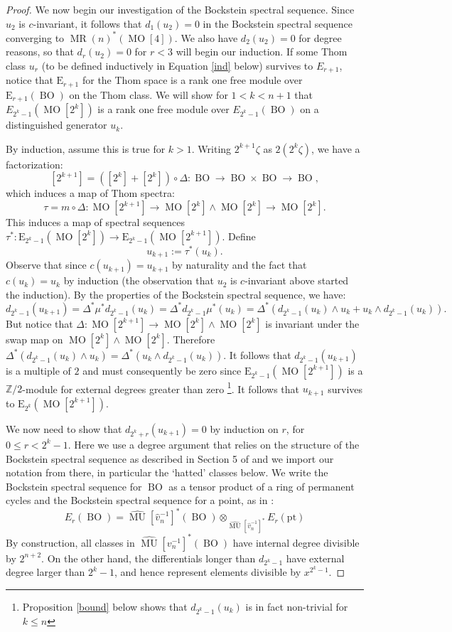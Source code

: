 \documentclass[12pt]{amsart}
\numberwithin{equation}{section}
\theoremstyle{plain}  %
\theoremstyle{definition}  %
\newcommand{\Z}{\mathbb{Z}}
\DeclareMathOperator{\BOg}{BO}
\DeclareMathOperator{\MO}{MO}
\DeclareMathOperator{\MUR}{MR}
\DeclareMathOperator{\MUg}{MU}
\begin{document}
\begin{proof}
We now begin our investigation of the Bockstein spectral sequence. Since $u_2$ is $c$-invariant, it follows that $d_1(u_2)=0$ in the Bockstein spectral sequence converging to $\MUR(n)^*(\MO[4])$. We also have $d_2(u_2)=0$ for degree reasons, so that $d_r(u_2)=0$ for $r<3$ will begin our induction. If some Thom class $u_r$ (to be defined inductively in Equation \ref{ind} below) survives to $E_{r+1}$, notice that $\mbox{E}_{r+1}$ for the Thom space is a rank one free module over $\mbox{E}_{r+1}(\BOg)$ on the Thom class. We will show for $1<k<n+1$ that $E_{2^k-1}(\MO[2^k])$ is a rank one free module over $E_{2^k-1}(\BOg)$ on a distinguished generator $u_k$. 

By induction, assume this is true for $k>1$. Writing $2^{k+1}\zeta$ as $2(2^k\zeta)$, we have a factorization:
\[ [2^{k+1}] = ([2^k] + [2^k]) \circ \Delta : 
\BOg \longrightarrow \BOg \times \BOg \longrightarrow \BOg, \]
which induces a map of Thom spectra:
\[ \tau = m \circ \Delta : \MO[2^{k+1}] \longrightarrow \MO[2^k] 
\wedge \MO[2^k] \longrightarrow \MO[2^k]. \]
This induces a map of spectral sequences $\tau^\ast : 
\mbox{E}_{2^{k}-1}(\MO[2^k]) \longrightarrow 
\mbox{E}_{2^k-1}(\MO[2^{k+1}])$. 
Define 
\begin{equation}\label{ind}u_{k+1}:=\tau^\ast(u_k).\end{equation}
Observe that since $c(u_{k+1})=u_{k+1}$ by naturality and the fact that $c(u_k)=u_k$ by induction (the observation that $u_2$ is $c$-invariant above started the induction). By the properties of the Bockstein spectral sequence, we have: 
\[ d_{2^k-1}(u_{k+1}) = \Delta^\ast \mu^\ast 
d_{2^{k}-1}(u_k) = \Delta^\ast d_{2^{k}-1} \mu^\ast (u_k) = 
\Delta^\ast (d_{2^{k}-1}(u_k) \wedge u_k + u_k 
\wedge d_{2^{k}-1}(u_k)). \]
But notice that $\Delta : \MO[2^{k+1}] 
\longrightarrow \MO[2^k] \wedge \MO[2^k]$ is invariant 
under the swap map on $\MO[2^k] \wedge \MO[2^k]$. 
Therefore $\Delta^\ast (d_{2^{k}-1}(u_k) \wedge u_k) = 
\Delta^\ast (u_k \wedge d_{2^{k}-1}(u_k))$. 
It follows that $d_{2^{k}-1}(u_{k+1})$ is a 
multiple of $2$ and must consequently be zero 
since $\mbox{E}_{2^{k}-1}(\MO[2^{k+1}])$ is a $\Z/2$-module 
for external degrees greater than zero \footnote{Proposition \ref{bound} below shows that $d_{2^k-1}(u_k)$ is in fact non-trivial for $k \leq n$}. It follows that $u_{k+1}$ survives 
to $\mbox{E}_{2^{k}}(\MO[2^{k+1}])$. 

\medskip
\noindent
We now need to show that $d_{2^{k}+r}(u_{k+1})=0$ by induction
on $r$, for $0 \le r < 2^{k}-1$. Here we use a degree argument that relies on the structure of the Bockstein spectral sequence as described in Section 5 of \cite{KW14} and we import our notation from there, in particular the `hatted' classes below. We write the Bockstein spectral sequence for $\BOg$ as a tensor product of a ring of permanent cycles and the Bockstein spectral sequence for a point, as in \cite{KW14}:
$$E_r(\BOg)=\hat{\MUg}[\hat{v}_n^{-1}]^*(\BOg) \otimes_{\hat{\MUg}[\hat{v}_n^{-1}]^*} E_r(\text{pt})$$
By construction, all classes in $\hat{\MUg}[v_n^{-1}]^\ast(\BOg)$ have internal 
degree divisible by $2^{n+2}$. On the other hand, the differentials 
longer than $d_{2^k-1}$ have external degree 
larger than $2^k-1$, and hence represent elements divisible by $x^{2^k-1}$. 


\end{proof}
\end{document}
